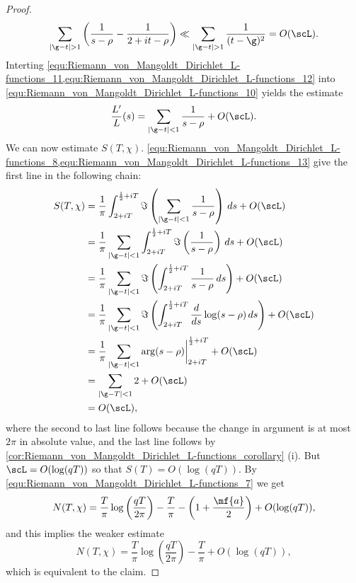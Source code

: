 \begin{proof}
        \begin{equation}\label{equ:Riemann_von_Mangoldt_Dirichlet_L-functions_12}
          \sum_{|\g-t| > 1}\left(\frac{1}{s-\rho}-\frac{1}{2+it-\rho}\right) \ll \sum_{|\g-t| > 1}\frac{1}{(t-\g)^{2}} = O(\scL).
        \end{equation}
        Interting \cref{equ:Riemann_von_Mangoldt_Dirichlet_L-functions_11,equ:Riemann_von_Mangoldt_Dirichlet_L-functions_12} into \cref{equ:Riemann_von_Mangoldt_Dirichlet_L-functions_10} yields the estimate
        \begin{equation}\label{equ:Riemann_von_Mangoldt_Dirichlet_L-functions_13}
          \frac{L'}{L}(s) = \sum_{|\g-t| < 1}\frac{1}{s-\rho}+O(\scL).
        \end{equation}
        We can now estimate $S(T,\chi)$. \cref{equ:Riemann_von_Mangoldt_Dirichlet_L-functions_8,equ:Riemann_von_Mangoldt_Dirichlet_L-functions_13} give the first line in the following chain:
        \begin{align*}
          S(T,\chi) &= \frac{1}{\pi}\int_{2+iT}^{\frac{1}{2}+iT}\Im\left(\sum_{|\g-t| < 1}\frac{1}{s-\rho}\right)\,ds+O(\scL) \\
          &= \frac{1}{\pi}\sum_{|\g-t| < 1}\int_{2+iT}^{\frac{1}{2}+iT}\Im\left(\frac{1}{s-\rho}\right)\,ds+O(\scL) \\
          &= \frac{1}{\pi}\sum_{|\g-t| < 1}\Im\left(\int_{2+iT}^{\frac{1}{2}+iT}\frac{1}{s-\rho}\,ds\right)+O(\scL) \\
          &= \frac{1}{\pi}\sum_{|\g-t| < 1}\Im\left(\int_{2+iT}^{\frac{1}{2}+iT}\frac{d}{ds}\log(s-\rho)\,ds\right)+O(\scL) \\
          &= \frac{1}{\pi}\sum_{|\g-t| < 1}\arg(s-\rho)\bigg|_{2+iT}^{\frac{1}{2}+iT}+O(\scL) \\
          &= \sum_{|\g-T| < 1}2+O(\scL) \\
          &= O(\scL),
        \end{align*}
        where the second to last line follows because the change in argument is at most $2\pi$ in absolute value, and the last line follows by \cref{cor:Riemann_von_Mangoldt_Dirichlet_L-functions_corollary} (i). But $\scL = O(\log(qT))$ so that $S(T) = O(\log(qT))$. By \cref{equ:Riemann_von_Mangoldt_Dirichlet_L-functions_7} we get
        \[
          N(T,\chi) = \frac{T}{\pi}\log\left(\frac{qT}{2\pi}\right)-\frac{T}{\pi}-\left(1+\frac{\mf{a}}{2}\right)+O(\log(qT)),
        \]
        and this implies the weaker estimate
        \[
          N(T,\chi) = \frac{T}{\pi}\log\left(\frac{qT}{2\pi}\right)-\frac{T}{\pi}+O(\log(qT)),
        \]
        which is equivalent to the claim.
      \end{proof}